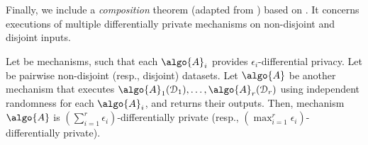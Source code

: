 			Finally, we include a \emph{composition} theorem (adapted from \cite{privacy-integrated-queries}) based on \cite{differential-privacy-original,our-data-ourselves}. %
			It concerns executions of multiple differentially private mechanisms on non-disjoint and disjoint inputs.

			\begin{theorem}\label{theorem:composition}
				Let  be mechanisms, such that each $\algo{A}_i$ provides $\epsilon_i$-differential privacy.
				Let  be pairwise non-disjoint (resp., disjoint) datasets.
				Let $\algo{A}$ be another mechanism that executes $\algo{A}_1(\database_1), \ldots, \algo{A}_r(\database_r)$ using independent randomness for each $\algo{A}_i$, and returns their outputs.
				Then, mechanism $\algo{A}$ is $\left( \sum_{i=1}^r \epsilon_i \right)$-differentially private (resp., $\left( \max_{i=1}^r \epsilon_i \right)$-differentially private).
			\end{theorem}
